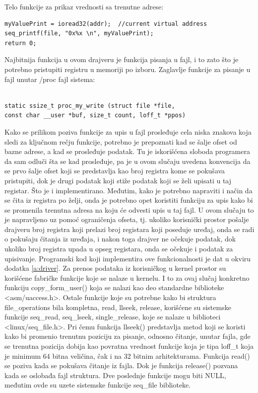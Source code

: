 \documentclass[a4paper, 12pt, diplomski]{etf}
\begin{document}
	Telo funkcije za prikaz vrednosti sa trenutne adrese:

\begin{verbatim}
myValuePrint = ioread32(addr);  //current virtual address
seq_printf(file, "0x%x \n", myValuePrint);
return 0;
\end{verbatim}

	Najbitnija funkcija u ovom drajveru je funkcija pisanja u fajl, i to zato što je potrebno pristupiti registru u memoriji po izboru. Zaglavlje funkcije za pisanje u fajl unutar /proc fajl sistema:

\begin{verbatim}

static ssize_t proc_my_write (struct file *file,
const char __user *buf, size_t count, loff_t *ppos)

\end{verbatim}


	Kako se prilikom poziva funkcije za upis u fajl prosleđuje cela niska znakova koja sledi za ključnom rečju funkcije, potrebno je prepoznati kad se šalje ofset od bazne adrese, a kad se prosleđuje podatak. Tu je iskorišćena sloboda programera da sam odluči šta se kad prosleđuje, pa je u ovom slučaju uvedena konvencija da se prvo šalje ofset koji se predstavlja kao broj registra kome se pokušava pristupiti, dok je drugi podatak koji stiže podatak koji se želi upisati u taj registar. Što je i implementirano. Međutim, kako je potrebno napraviti i način da se čita iz registra po želji, onda je potrebno opet koristiti funkciju za upis kako bi se promenila trenutna adresa na koju će odvesti upis u taj fajl. U ovom slučaju to je napravljeno uz pomoć ograničenja ofseta, tj. ukoliko korisnički prostor pošalje drajveru broj registra koji prelazi broj registara koji poseduje uređaj, onda se radi o pokušaju čitanja iz uređaja, i nakon toga drajver ne očekuje podatak, dok ukoliko broj registra upada u opseg registara, onda se očekuje i podatak za upisivanje. Programski kod koji implementira ove funkcionalnosti je dat u okviru dodatka \ref{a:driver}. Za prenos podataka iz korisničkog u kernel prostor su korišćene fabričke funkcije koje se nalaze u kernelu. I to za ovaj slučaj konkretno funkciju copy\_form\_user() koja se nalazi kao deo standardne biblioteke <asm/uaccess.h>. Ostale funkcije koje su potrebne kako bi struktura file\_operations bila kompletna, read, llseek, release, korišćene su sistemske funkcije seq\_read, seq\_lseek, single\_release, koje se nalaze u biblioteci <linux/seq\_file.h>. Pri čemu funkcija llseek() predstavlja metod koji se koristi kako bi promenio trenutnu poziciju za pisanje, odnosno čitanje, unutar fajla, gde se trenutna pozicija dobija kao povratna vrednost funkcije koja je tipa loff\_t koja je minimum 64 bitna veličina, čak i na 32 bitnim arhitekturama. Funkcija read() se poziva kada se pokušava čitanje iz fajla. Dok je funkcija release() pozvana kada se oslobađa fajl struktura. Dve poslednje funkcije mogu biti NULL, međutim ovde su uzete sistemske funkcije seq\_file biblioteke.
\end{document}
